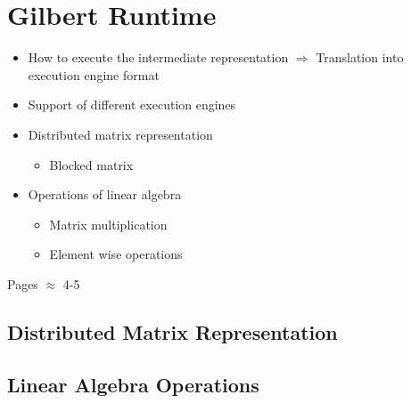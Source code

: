 \chapter{Gilbert Runtime}
\label{cha:gilbertexecution}

\begin{itemize}
	\item How to execute the intermediate representation $\Rightarrow$ Translation into execution engine format
	\item Support of different execution engines
	\item Distributed matrix representation
	\begin{itemize}
		\item Blocked matrix
	\end{itemize}
	\item Operations of linear algebra
	\begin{itemize}
		\item Matrix multiplication
		\item Element wise operations
	\end{itemize}
\end{itemize}

Pages $\approx$ 4-5

\section{Distributed Matrix Representation}

\section{Linear Algebra Operations}